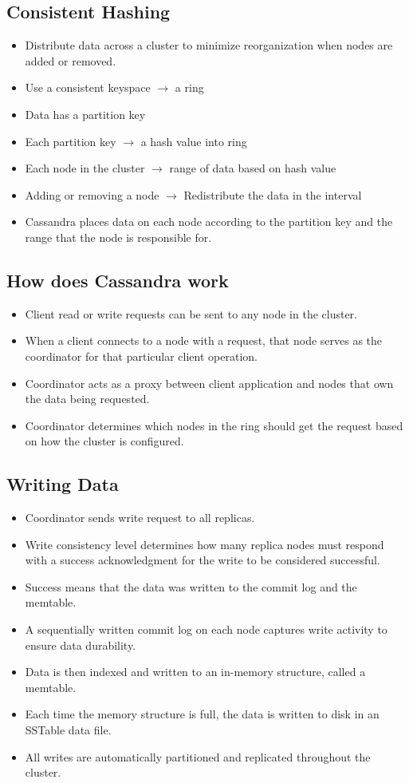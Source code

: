 \subsection{Consistent Hashing}
\begin{itemize}
  \item Distribute data across a cluster to minimize reorganization when nodes are added or removed.
  \item Use a consistent keyspace $\rightarrow$ a ring
  \item Data has a partition key
  \item Each partition key $\rightarrow$ a hash value into ring
  \item Each node in the cluster $\rightarrow$ range of data based on hash value
  \item Adding or removing a node $\rightarrow$ Redistribute the data in the interval
  \item Cassandra places data on each node according to the partition key and the range that the node is responsible for.
\end{itemize}
\subsection{How does Cassandra work}
\begin{itemize}
  \item Client read or write requests can be sent to any node in the cluster.
  \item When a client connects to a node with a request, that node serves as the coordinator for that particular client operation.
  \item Coordinator acts as a proxy between client application and nodes that own the data being requested.
  \item Coordinator determines which nodes in the ring should get the request based on how the cluster is configured.
\end{itemize}
\subsection{Writing Data}
\begin{itemize}
  \item Coordinator sends write request to all replicas.
  \item Write consistency level determines how many replica nodes must respond with a success acknowledgment for the write to be considered successful.
  \item Success means that the data was written to the commit log and the memtable.
\end{itemize}
\begin{itemize}
  \item A sequentially written commit log on each node captures write activity to ensure data durability.
  \item Data is then indexed and written to an in-memory structure, called a memtable.
  \item Each time the memory structure is full, the data is written to disk in an SSTable data file.
  \item All writes are automatically partitioned and replicated throughout the cluster.
\end{itemize}
